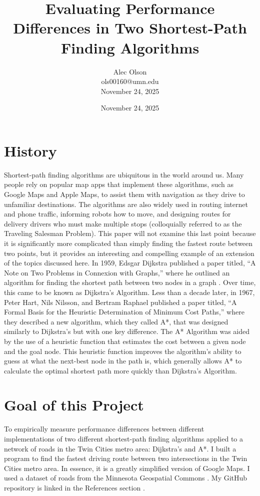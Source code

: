\documentclass[conference]{IEEEtran}
\title{Evaluating Performance Differences in Two Shortest-Path Finding Algorithms}
\author{Alec Olson \\ ols00160@umn.edu \\ November 24, 2025}
\date{November 24, 2025}
\begin{document}
\maketitle

\section{History}
Shortest-path finding algorithms are ubiquitous in the world around us. Many people rely on popular map apps that implement these algorithms, such as Google Maps and Apple Maps, to assist them with navigation as they drive to unfamiliar destinations. The algorithms are also widely used in routing internet and phone traffic, informing robots how to move, and designing routes for delivery drivers who must make multiple stops (colloquially referred to as the Traveling Salesman Problem). This paper will not examine this last point because it is significantly more complicated than simply finding the fastest route between two points, but it provides an interesting and compelling example of an extension of the topics discussed here.
\newline
\newline
In 1959, Edsgar Dijkstra published a paper titled, “A Note on Two Problems in Connexion with Graphs,” where he outlined an algorithm for finding the shortest path between two nodes in a graph \cite{dijkstra_note_1959}. Over time, this came to be known as Dijkstra’s Algorithm. Less than a decade later, in 1967, Peter Hart, Nils Nilsson, and Bertram Raphael published a paper titled, “A Formal Basis for the Heuristic Determination of Minimum Cost Paths,” where they described a new algorithm, which they called A*, that was designed similarly to Dijkstra’s but with one key difference. The A* Algorithm was aided by the use of a heuristic function that estimates the cost between a given node and the goal node. This heuristic function improves the algorithm’s ability to guess at what the next-best node in the path is, which generally allows A* to calculate the optimal shortest path more quickly than Dijkstra’s Algorithm. 

\section{Goal of this Project}
To empirically measure performance differences between different implementations of two different shortest-path finding algorithms applied to a network of roads in the Twin Cities metro area: Dijkstra’s and A*.
\newline
\newline
I built a program to find the fastest driving route between two intersections in the Twin Cities metro area. In essence, it is a greatly simplified version of Google Maps. I used a dataset of roads from the Minnesota Geospatial Commons \cite{MetroGIS}. My GitHub repository is linked in the References section \cite{github}.
\end{document}
